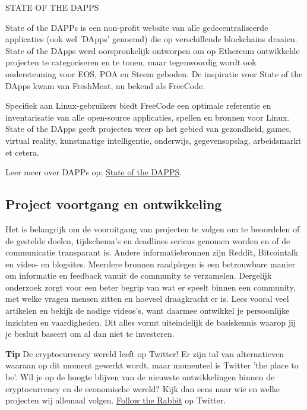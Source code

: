 \medskip

\begin{cryptobox}{STATE OF THE DAPPS}

    State of the DAPPs is een non-profit website van alle gedecentraliseerde applicaties (ook wel 'DApps' genoemd) die op verschillende blockchains draaien. State of the DApps werd oorspronkelijk ontworpen om op Ethereum ontwikkelde projecten te categoriseren en te tonen, maar tegenwoordig wordt ook ondersteuning voor EOS, POA en Steem geboden. De inspiratie voor State of the DApps kwam van FreshMeat, nu bekend als FreeCode. 
    
    Specifiek aan Linux-gebruikers biedt FreeCode een optimale referentie en inventarisatie van alle open-source applicaties, spellen en bronnen voor Linux. State of the DApps geeft projecten weer op het gebied van gezondheid, games, virtual reality, kunstmatige intelligentie, onderwijs, gegevensopslag, arbeidsmarkt et cetera. 
    
    \tcblower
    Leer meer over DAPPs op; \href{https://www.stateofthedapps.com}{State of the DAPPS}.

\end{cryptobox}

\medskip

\subsection*{Project voortgang en ontwikkeling}
Het is belangrijk om de vooruitgang van projecten te volgen om te beoordelen of de gestelde doelen, tijdschema's en deadlines serieus genomen worden en of de communicatie transparant is. Andere informatiebronnen zijn Reddit, Bitcointalk en video- en blogsites. Meerdere bronnen raadplegen is een betrouwbare manier om informatie en feedback vanuit de community te verzamelen. Dergelijk onderzoek zorgt voor een beter begrip van wat er speelt binnen een community, met welke vragen mensen zitten en hoeveel draagkracht er is. Lees vooral veel artikelen en bekijk de nodige videos's, want daarmee ontwikkel je persoonlijke inzichten en vaardigheden. Dit alles vormt uiteindelijk de basiskennis waarop jij je besluit baseert om al dan niet te investeren.

    \bigskip
    \begin{tipbox}{\textbf{Tip}}
        De cryptocurrency wereld leeft op Twitter! Er zijn tal van alternatieven waaraan op dit moment gewerkt wordt, maar momenteel is Twitter 'the place to be'. Wil je op de hoogte blijven van de nieuwste ontwikkelingen binnen de cryptocurrency en de economische wereld? Kijk dan eens naar wie en welke projecten wij allemaal volgen.
        \tcblower
        \href{https://twitter.com/cryptomanuals}{Follow the Rabbit} op Twitter.
    \end{tipbox}

